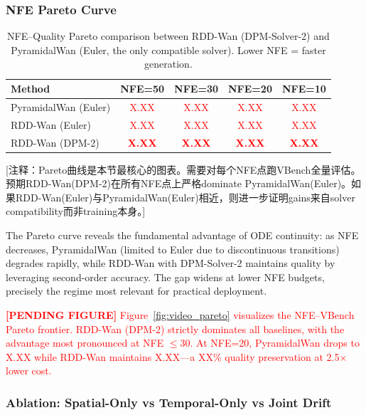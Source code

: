 \subsubsection{NFE Pareto Curve}

\begin{table}[t]
\centering
\caption{NFE--Quality Pareto comparison between RDD-Wan (DPM-Solver-2) and PyramidalWan (Euler, the only compatible solver). Lower NFE = faster generation.}
\label{tab:video_pareto}
\small
\begin{tabular}{@{}lcccc@{}}
\toprule
\textbf{Method} & \textbf{NFE=50} & \textbf{NFE=30} & \textbf{NFE=20} & \textbf{NFE=10} \\
\midrule
PyramidalWan (Euler) & \textcolor{red}{X.XX} & \textcolor{red}{X.XX} & \textcolor{red}{X.XX} & \textcolor{red}{X.XX} \\
RDD-Wan (Euler) & \textcolor{red}{X.XX} & \textcolor{red}{X.XX} & \textcolor{red}{X.XX} & \textcolor{red}{X.XX} \\
RDD-Wan (DPM-2) & \textcolor{red}{\textbf{X.XX}} & \textcolor{red}{\textbf{X.XX}} & \textcolor{red}{\textbf{X.XX}} & \textcolor{red}{\textbf{X.XX}} \\
\bottomrule
\end{tabular}
\end{table}

\textcolor{green!50!black}{[注释：Pareto曲线是本节最核心的图表。需要对每个NFE点跑VBench全量评估。预期RDD-Wan(DPM-2)在所有NFE点上严格dominate PyramidalWan(Euler)。如果RDD-Wan(Euler)与PyramidalWan(Euler)相近，则进一步证明gains来自solver compatibility而非training本身。]}

The Pareto curve reveals the fundamental advantage of ODE continuity: as NFE decreases, PyramidalWan (limited to Euler due to discontinuous transitions) degrades rapidly, while RDD-Wan with DPM-Solver-2 maintains quality by leveraging second-order accuracy.
The gap widens at lower NFE budgets, precisely the regime most relevant for practical deployment.

\textcolor{red}{%
\textbf{[PENDING FIGURE]} Figure~\ref{fig:video_pareto} visualizes the NFE--VBench Pareto frontier.
RDD-Wan (DPM-2) strictly dominates all baselines, with the advantage most pronounced at NFE $\leq 30$.
At NFE=20, PyramidalWan drops to X.XX while RDD-Wan maintains X.XX---a XX\% quality preservation at 2.5$\times$ lower cost.
}

\subsubsection{Ablation: Spatial-Only vs Temporal-Only vs Joint Drift}

